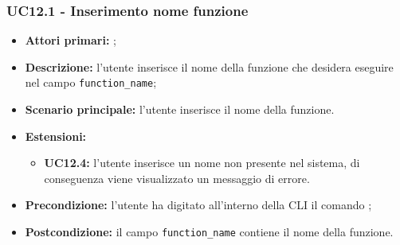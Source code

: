 \subsubsection{UC12.1 - Inserimento nome funzione}
\begin{itemize}
	\item \textbf{Attori primari:} \ua{};
	\item \textbf{Descrizione:} l’utente inserisce il nome della funzione che desidera eseguire nel campo \texttt{function\_name};
	\item \textbf{Scenario principale:} l'utente inserisce il nome della funzione. 
	\item \textbf{Estensioni:} 
	\begin{itemize}
		\item \textbf{UC12.4:} l’utente inserisce un nome non presente nel sistema, di conseguenza viene visualizzato un messaggio di errore.
	\end{itemize}
	\item \textbf{Precondizione:} l’utente ha digitato all’interno della CLI il comando \run{};
	\item \textbf{Postcondizione:}  il campo \texttt{function\_name} contiene il nome della funzione.
\end{itemize}